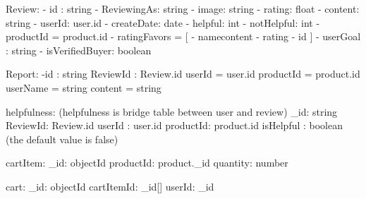 Review:
    - id : string
    - ReviewingAs: string
    - image: string
    - rating: float
    - content: string
    - userId: user.id
    - createDate: date
    - helpful: int
    - notHelpful: int
    - productId = product.id 
    - ratingFavors = [{
        - namecontent
        - rating
        - id
    }]
    - userGoal : string
    - isVerifiedBuyer: boolean

Report:
    -id : string
    ReviewId : Review.id
    userId = user.id
    productId = product.id
    userName = string
    content = string

helpfulness: (helpfulness is bridge table between user and review)
    _id: string
    ReviewId: Review.id
    userId : user.id
    productId: product.id
    isHelpful : boolean (the default value is false)

cartItem:
    _id: objectId
    productId: product._id
    quantity: number

cart: 
    _id: objectId
    cartItemId: _id[]
    userId: _id